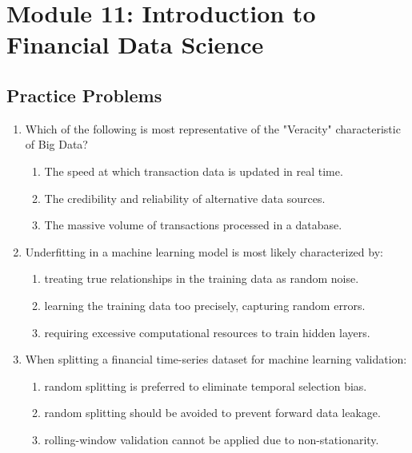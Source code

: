 \newpage

\section{Module 11: Introduction to Financial Data Science}
\label{sec:app_Problems_M11}

\subsection{Practice Problems}
\label{subsec:app_Problems_M11}

\begin{enumerate}
	\item Which of the following is most representative of the "Veracity" characteristic of Big Data?
	      \begin{enumerate}[label=\Alph*.]
		      \item The speed at which transaction data is updated in real time.
		      \item The credibility and reliability of alternative data sources.
		      \item The massive volume of transactions processed in a database.
	      \end{enumerate}
	
	\item Underfitting in a machine learning model is most likely characterized by:
	      \begin{enumerate}[label=\Alph*.]
		      \item treating true relationships in the training data as random noise.
		      \item learning the training data too precisely, capturing random errors.
		      \item requiring excessive computational resources to train hidden layers.
	      \end{enumerate}

	\item When splitting a financial time-series dataset for machine learning validation:
	      \begin{enumerate}[label=\Alph*.]
		      \item random splitting is preferred to eliminate temporal selection bias.
		      \item random splitting should be avoided to prevent forward data leakage.
		      \item rolling-window validation cannot be applied due to non-stationarity.
	      \end{enumerate}


\end{enumerate}
